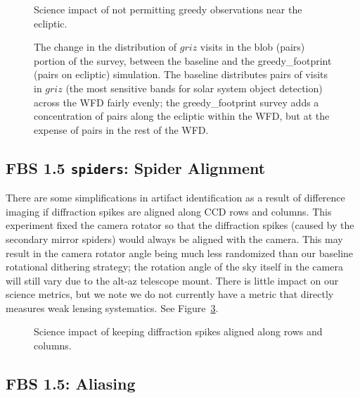 \begin{figure}
\caption{Science impact of not permitting greedy observations near the ecliptic. }
\label{fig:greedy_radar}
\end{figure}

\begin{figure}
\caption{The change in the distribution of $griz$  visits in the blob (pairs) portion of the survey, between the baseline and the greedy\_footprint (pairs on ecliptic) simulation. The baseline distributes pairs of visits in $griz$ (the most sensitive bands for solar system object detection) across the WFD fairly evenly; the greedy\_footprint survey adds a concentration of pairs along the ecliptic within the WFD, but at the expense of pairs in the rest of the WFD.}
\label{fig:greedy_nvisits}
\end{figure}

\subsection{FBS 1.5 {\tt spiders}: Spider Alignment}

There are some simplifications in artifact identification as a result of difference imaging if diffraction spikes are aligned along CCD rows and columns. This experiment fixed the camera rotator so that the diffraction spikes (caused by the secondary mirror spiders) would always be aligned with the camera. This may result in the camera rotator angle being much less randomized than our baseline rotational dithering strategy; the rotation angle of the sky itself in the camera will still vary due to the alt-az telescope mount. There is little impact on our science metrics, but we note we do not currently have a metric that directly measures weak lensing systematics. See Figure~\ref{fig:spider_radar}. 

\begin{figure}
\caption{Science impact of keeping diffraction spikes aligned along rows and columns. }
\label{fig:spider_radar}
\end{figure}


\subsection{FBS 1.5: Aliasing}\label{ss:aliasing}

